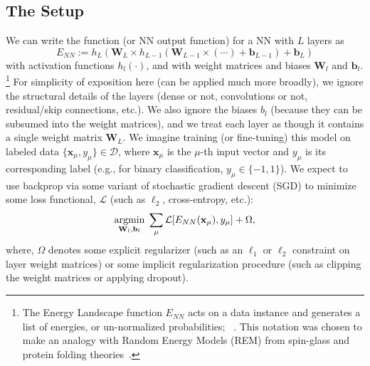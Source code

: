 \subsection{The \HTSR Setup}
\label{sxn:htsr_setup}

We can write the \EnergyLandscape function 
(or NN output function) for a 
NN with $L$ layers as
\begin{equation}
\label{eqn:dnn_energy}
E_{NN}:=h_{L}(\mathbf{W}_{L}\times h_{L-1}(\mathbf{W}_{L-1}\times(\cdots)+\mathbf{b}_{L-1})+\mathbf{b}_{L}) 
\end{equation}
with activation functions $h_{l}(\cdot)$, and with weight matrices and biases $\mathbf{W}_{l}$ and $\mathbf{b}_{l}$.%
\footnote{The Energy Landscape function $E_{NN}$ acts on a data instance and generates a list of energies, or un-normalized probabilities;
~\cite{MM18_TR_JMLRversion}.
This notation was chosen to make an analogy with Random Energy Models (REM)
from spin-glass and protein folding theories~\cite{DerridaREM1981, BryngelsonWolynesPNAS1987}.
}
For simplicity of exposition here (\HTSR can be applied much more broadly), we ignore the structural details of the layers (dense or not, convolutions or not, residual/skip connections, etc.).
We also ignore the biases $b_{l}$ (because they can be subsumed into the weight matrices),
and we treat each layer as though it contains a single weight matrix $\mathbf{W}_{L}$.
We imagine training (or fine-tuning) this model on labeled data $\{\mathbf{x}_{\mu},y_{\mu}\}\in\mathcal{D}$, where $ \mathbf{x}_\mu $ is the $\mu$-th input vector and $y_\mu$ is its corresponding label (e.g., for binary classification, $y_{\mu}\in\{-1,1\}$).
We expect to use backprop via some variant of stochastic gradient descent (SGD) to minimize some loss functional, $\mathcal{L}$ (such as $\ell_2$, cross-entropy, etc.):  
\begin{equation}
\underset{\mathbf{W}_{l},\mathbf{b}_{l}}{\text{argmin}}\;\sum_{\mu}\mathcal{L}[E_{NN}(\mathbf{x}_{\mu}),y_{\mu}]+\Omega ,
\label{eqn:dnn_opt}
\end{equation}
where, $\Omega$ denotes some explicit regularizer (such as an $\ell_1$ or $\ell_2$ constraint on layer weight matrices) or some implicit regularization procedure (such as clipping the weight matrices or applying dropout).

